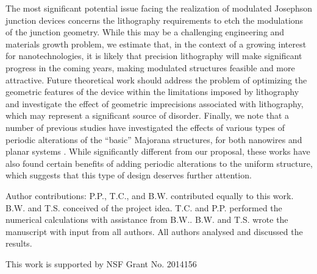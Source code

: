 \documentclass[twocolumn,aps,prb,nofootinbib]{revtex4-2}
\begin{document}
The most significant potential issue facing the realization of modulated Josephson junction devices concerns the lithography requirements to etch the modulations of the junction geometry. While this may be a challenging engineering and materials growth problem, we estimate that, in the context of a growing interest for nanotechnologies, it is likely that precision lithography will make significant progress  in the coming years, making modulated structures feasible and more attractive. Future theoretical work should address the problem of optimizing the geometric features of the device within the limitations imposed by lithography and investigate the effect of geometric imprecisions associated with lithography, which may represent a significant source of disorder. 
Finally, we note that a number of previous studies have investigated the effects of various types of periodic alterations of the ``basic'' Majorana structures, for both nanowires \cite{Adagideli2014,Levine2017,Escribano2019}  and planar systems \cite{Woods2020b,Laeven2020,Lesser2021}. While significantly different from our proposal, these works have also found  certain benefits of adding  periodic alterations to the uniform structure, which suggests that this type of design deserves further attention. 

Author contributions: P.P., T.C., and B.W. contributed equally to this work. B.W. and T.S. conceived of the project idea. T.C. and P.P. performed the numerical calculations with assistance from B.W.. B.W. and T.S.  wrote the manuscript with input from all authors. All authors analysed and discussed the results.


\begin{acknowledgments}
This  work  is  supported  by  NSF Grant No. 2014156
\end{acknowledgments}


\appendix
\renewcommand{\thefigure}{A\arabic{figure}}

\setcounter{figure}{0}
\end{document}
